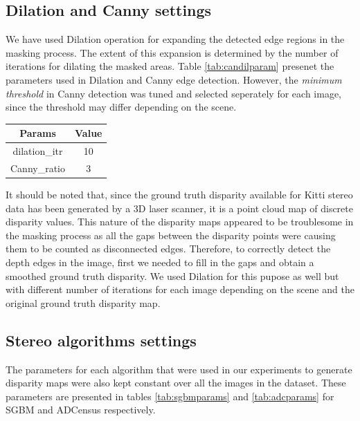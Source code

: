 \subsection{Dilation and Canny settings}
We have used Dilation operation for expanding the detected edge regions in the masking process. The extent of this expansion
is determined by the number of iterations for dilating the masked areas. Table \ref{tab:candilparam} presenet the parameters used in Dilation
and Canny edge detection. However, the \textit{minimum threshold} in Canny detection was tuned and selected seperately for each image, 
since the threshold may differ depending on the scene.

\begin{minipage}{\linewidth}
\begin{center}
\label{tab:candilparam}
\begin{tabular}{ |c|c| }
\hline
\textbf{Params} & \textbf{Value} \\ \hline
dilation\_itr & 10 \\  \hline
Canny\_ratio & 3 \\ \hline
\end{tabular}
\end{center}
\end{minipage} \newline

It should be noted that, since the ground truth disparity available for Kitti stereo data has been generated by a 3D laser scanner,
it is a point cloud map of discrete disparity values. This nature of the disparity maps appeared to be troublesome in the masking process as all the gaps
between the disparity points were causing them to be counted as disconnected edges. Therefore, to correctly detect the 
depth edges in the image, first we needed to fill in the gaps and obtain a smoothed ground truth disparity. We used Dilation for this pupose as well but with different number
of iterations for each image depending on the scene and the original ground truth disparity map.


\subsection{Stereo algorithms settings}
The parameters for each algorithm that were used in our experiments to generate disparity
maps were also kept constant over all the images in the dataset. These parameters are presented in tables \ref{tab:sgbmparams} and \ref{tab:adcparams} 
for SGBM and ADCensus respectively. \newline

